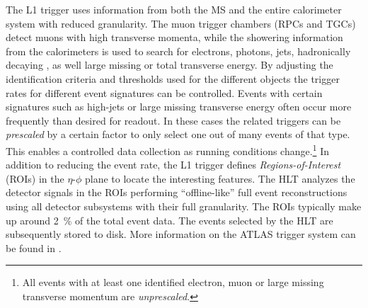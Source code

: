 The L1 trigger uses information from both the MS and the entire calorimeter system with reduced granularity.
The muon trigger chambers (RPCs and TGCs) detect muons with high transverse momenta, while the showering information from the calorimeters is used to search for electrons, photons, jets, hadronically decaying \tauleptons, as well large missing or total transverse energy.
By adjusting the identification criteria and thresholds used for the different objects the trigger rates for different event signatures can be controlled.
Events with certain signatures such as high-\pT jets or large missing transverse energy often occur more frequently than desired for readout. In these cases the related triggers can be \emph{prescaled} by a certain factor to only select one out of many events of that type. This enables a controlled data collection as running conditions change.\footnote{All events with at least one identified electron, muon or large missing transverse momentum are \emph{unprescaled}.}
In addition to reducing the event rate, the L1 trigger defines \emph{Regions-of-Interest} (ROIs) in the $\eta$-$\phi$ plane to locate the interesting features.
The HLT analyzes the detector signals in the ROIs performing ``offline-like'' full event reconstructions using all detector subsystems with their full granularity. The ROIs typically make up around \SI{2}{\percent} of the total event data.
The events selected by the HLT are subsequently stored to disk.
More information on the ATLAS trigger system can be found in .



